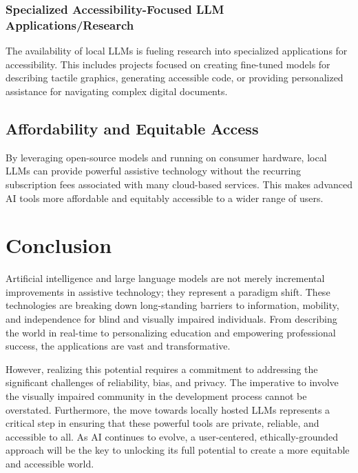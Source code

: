 \subsubsection{Specialized Accessibility-Focused LLM Applications/Research}\label{ch9:sssec:local-llm-research}
The availability of local LLMs is fueling research into specialized applications for accessibility. This includes projects focused on creating fine-tuned models for describing tactile graphics, generating accessible code, or providing personalized assistance for navigating complex digital documents.

\subsection{Affordability and Equitable Access}\label{ch9:ssec:local-llm-affordability}
By leveraging open-source models and running on consumer hardware, local LLMs can provide powerful assistive technology without the recurring subscription fees associated with many cloud-based services. This makes advanced AI tools more affordable and equitably accessible to a wider range of users.

\section{Conclusion}\label{ch9:sec:conclusion}
Artificial intelligence and large language models are not merely incremental improvements in assistive technology; they represent a paradigm shift. These technologies are breaking down long-standing barriers to information, mobility, and independence for blind and visually impaired individuals. From describing the world in real-time to personalizing education and empowering professional success, the applications are vast and transformative.

However, realizing this potential requires a commitment to addressing the significant challenges of reliability, bias, and privacy. The imperative to involve the visually impaired community in the development process cannot be overstated. Furthermore, the move towards locally hosted LLMs represents a critical step in ensuring that these powerful tools are private, reliable, and accessible to all. As AI continues to evolve, a user-centered, ethically-grounded approach will be the key to unlocking its full potential to create a more equitable and accessible world.
